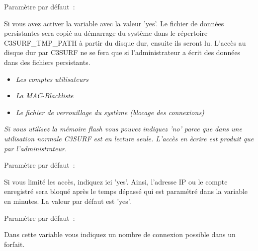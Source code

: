 \begin{itemize}
\begin{description}

  Paramètre par défaut~: 

  Si vous avez activer la variable 
  avec la valeur 'yes'. Le fichier de données persistantes sera copié au
  démarrage du système dans le répertoire C3SURF\_TMP\_PATH à partir du disque
  dur, ensuite ils seront lu. L'accès au disque dur par C3SURF ne se fera que
  si l'administrateur a écrit des données dans des fichiers persistants.

  \begin{itemize}
  \item \emph{Les comptes utilisateurs}
  \item \emph{La MAC-Blackliste}
  \item \emph{Le fichier de verrouillage du système (blocage des connexions)}\\
  \end{itemize}

  \emph{Si vous utilisez la mémoire flash vous pouvez indiquez 'no' parce que dans
  une utilisation normale C3SURF est en lecture seule. L'accès en ècrire
  est produit que par l'administrateur.}


  Paramètre par défaut~: 

  Si vous limité les accès, indiquez ici 'yes'. Ainsi, l'adresse IP ou le compte
  enregistré sera bloqué après le temps dépassé qui est paramétré dans la variable
   en minutes.
  La valeur par défaut est 'yes'.



  Paramètre par défaut~: 

  Dans cette variable vous indiquez un nombre de connexion possible dans un forfait.



\end{description}
\end{itemize}
